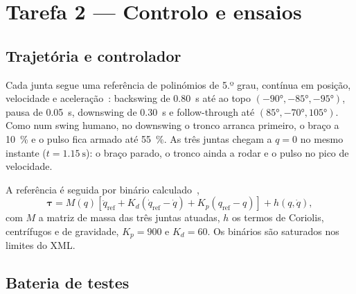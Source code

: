 \documentclass[11pt,a4paper]{article}
\begin{document}
\section{Tarefa 2 --- Controlo e ensaios}

\subsection{Trajetória e controlador}
\label{sec:controlo}

Cada junta segue uma referência de polinómios de 5.º grau, contínua em posição,
velocidade e aceleração~\cite{sequeira2024}: backswing de \SI{0.80}{\second}
até ao topo $(\ang{-90}, \ang{-85}, \ang{-95})$, pausa de \SI{0.05}{\second},
downswing de \SI{0.30}{\second} e follow-through até
$(\ang{85}, \ang{-70}, \ang{105})$. Como num swing humano, no downswing o
tronco arranca primeiro, o braço a \SI{10}{\percent} e o pulso fica armado até
\SI{55}{\percent}. As três juntas chegam a $q=0$ no mesmo instante
($t=\SI{1.15}{\second}$): o braço parado, o tronco ainda a rodar e o pulso no
pico de velocidade.

A referência é seguida por binário calculado~\cite{siciliano2009,sequeira2024},
\begin{equation}
  \boldsymbol\tau = M(q)\left[\ddot q_{\text{ref}}
      + K_d\left(\dot q_{\text{ref}} - \dot q\right)
      + K_p\left(q_{\text{ref}} - q\right)\right] + h(q,\dot q),
  \label{eq:ct}
\end{equation}
com $M$ a matriz de massa das três juntas atuadas, $h$ os termos de Coriolis,
centrífugos e de gravidade, $K_p = 900$ e $K_d = 60$. Os binários são saturados
nos limites do XML.

\subsection{Bateria de testes}
\end{document}
